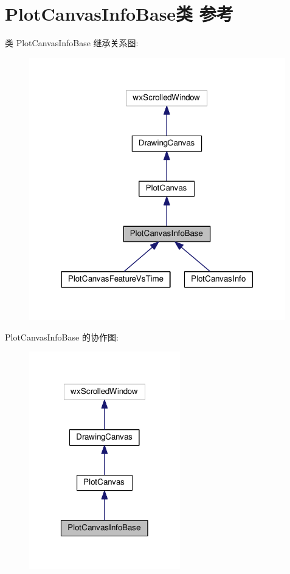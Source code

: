 \hypertarget{class_plot_canvas_info_base}{\section{Plot\+Canvas\+Info\+Base类 参考}
\label{class_plot_canvas_info_base}
}


类 Plot\+Canvas\+Info\+Base 继承关系图\+:
\nopagebreak
\begin{figure}[H]
\begin{center}
\leavevmode
\includegraphics[width=316pt]{class_plot_canvas_info_base__inherit__graph}
\end{center}
\end{figure}


Plot\+Canvas\+Info\+Base 的协作图\+:
\nopagebreak
\begin{figure}[H]
\begin{center}
\leavevmode
\includegraphics[width=186pt]{class_plot_canvas_info_base__coll__graph}
\end{center}
\end{figure}
